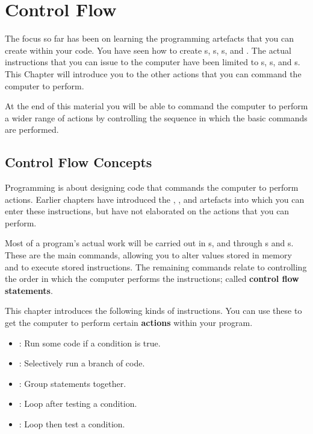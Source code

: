 \chapter{Control Flow} %
\label{cha:control_flow}

The focus so far has been on learning the programming artefacts that you can create within your code. You have seen how to create s, s, s, and . The actual instructions that you can issue to the computer have been limited to s, s, and s. This Chapter will introduce you to the other actions that you can command the computer to perform.

At the end of this material you will be able to command the computer to perform a wider range of actions by controlling the sequence in which the basic commands are performed.

\minitoc

\clearpage
\section{Control Flow Concepts} %
\label{sec:control_flow_concepts}

Programming is about designing code that commands the computer to perform actions. Earlier chapters have introduced the , , and  artefacts into which you can enter these instructions, but have not elaborated on the actions that you can perform.

Most of a program's actual work will be carried out in s, and through s and s. These are the main commands, allowing you to alter values stored in memory and to execute stored instructions. The remaining commands relate to controlling the order in which the computer performs the instructions; called \textbf{control flow statements}.

This chapter introduces the following kinds of instructions. You can use these to get the computer to perform certain \textbf{actions} within your program.
\begin{itemize}
  \item {}: Run some code if a condition is true.
  \item {}: Selectively run a branch of code.
  \item {}: Group statements together.
  \item {}: Loop after testing a condition.
  \item {}: Loop then test a condition.
\end{itemize}

